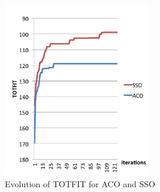  \begin{figure}[H]
    \begin{center}
    \includegraphics[width=2.5in]{assets/acovsssoNEW.png}
    \end{center}
    \caption{Evolution of TOTFIT for ACO and SSO }
    \label{fig:acovssso} 
\end{figure}

